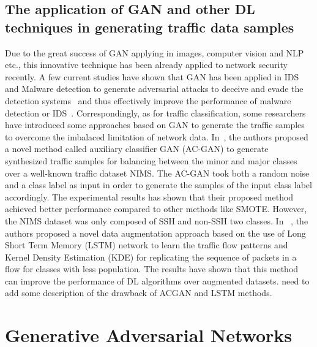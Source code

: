 \documentclass[conference]{IEEEtran}
\begin{document}
\subsection{The application of GAN and other DL techniques in generating traffic data samples}
Due to the great success of GAN applying in images, computer vision and NLP etc., this innovative technique has been already applied to network security recently. A few current studies have shown that GAN has been applied in IDS and Malware detection to generate adversarial attacks to deceive and evade the detection systems~\cite{Lin2018IDSGANGA,Hu2017GAN} and thus effectively improve the performance of malware detection or IDS~\cite{Hu2017GAN,KimGAN,Lin2018IDSGANGA,Salem2018GAN,Knife-Fight}. Correspondingly, as for traffic classification, some researchers have introduced some approaches based on GAN to generate the traffic samples to overcome the imbalaced limitation of network data. In~\cite{Vu-GAN}, the authors proposed a novel method called auxiliary classifier GAN (AC-GAN) to generate synthesized traffic samples for balancing between the minor and major classes over a well-known traffic dataset NIMS. The AC-GAN took both a random noise and a class label as input in order to generate the samples of the input class label accordingly. The experimental results has shown that their proposed method achieved better performance compared to other methods like SMOTE. However, the NIMS dataset was only composed of  SSH and non-SSH two classes. In ~\cite{Hasibi2019AugmentationSF}, the authors proposed a novel data augmentation approach based on the use of Long Short Term Memory (LSTM) network to learn the traffic flow patterns and Kernel Density Estimation (KDE) for replicating the sequence of packets in a flow for classes with less population. The results have shown that this method can improve the performance of DL algorithms over augmented datasets. {\color{red} need to add some description of the drawback of ACGAN and LSTM methods.}

\section{Generative Adversarial Networks}\label{gan}
\end{document}
